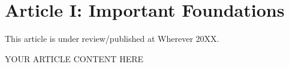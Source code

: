 \chapter{Article I: Important Foundations} \label{sec:article_1_main}
\begin{researchbox}
    This article is under review/published at Wherever 20XX.
\end{researchbox}

YOUR ARTICLE CONTENT HERE











